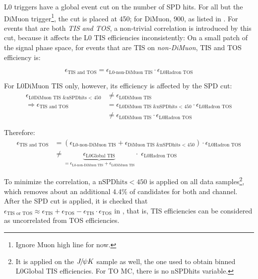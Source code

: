 L0 triggers have a global event cut on the number of SPD hits.
For all but the DiMuon trigger\footnote{
    Ignore Muon high \pt line for now.
}, the cut is placed at 450; for DiMuon, 900,
as listed in \cite{LHCb-INT-2019-025}.
For events that are both \emph{TIS and TOS}, a non-trivial correlation is
introduced by this cut, because it affects the L0 TIS efficiencies
inconsistently:
On a small patch of the signal \B phase space,
for events that are TIS on \emph{non-DiMuon}, TIS and TOS efficiency is:

\begin{equation}
    \epsilon_\text{TIS and TOS} =
        \epsilon_\text{L0-non-DiMuon TIS} \cdot \epsilon_\text{L0Hadron TOS}
\end{equation}

For L0DiMuon TIS only, however, its efficiency is affected by the SPD cut:
\begin{align}
    \epsilon_\text{L0DiMuon TIS \& nSPDhits < 450} & \neq
        \epsilon_\text{L0DiMuon TIS} \\
    \Rightarrow \epsilon_\text{TIS and TOS} & =
            \epsilon_\text{L0DiMuon TIS \& nSPDhits < 450} \cdot
            \epsilon_\text{L0Hadron TOS} \\
        & \neq
        \epsilon_\text{L0DiMuon TIS} \cdot \epsilon_\text{L0Hadron TOS}
\end{align}

Therefore:
\begin{align}
    \epsilon_\text{TIS and TOS} & =
        (\epsilon_\text{L0-non-DiMuon TIS} +
         \epsilon_\text{DiMuon TIS \& nSPDhits < 450}) \cdot
         \epsilon_\text{L0Hadron TOS} \\
    & \neq
        \underbrace{\epsilon_\text{L0Global TIS}}_{
            = \epsilon_\text{L0-non-DiMuon TIS} +
              \epsilon_\text{L0DiMuon TIS}
         } \cdot\; \epsilon_\text{L0Hadron TOS}
\end{align}

To minimize the correlation, a $\text{nSPDhits} < 450$ is applied on all data
samples\footnote{
    It is applied on the ${{J\mskip -3mu/\mskip -2mu\psi}} K$ sample as well, the one used to obtain
    binned L0Global TIS efficiencies.
    For TO MC, there is no nSPDhits variable.
}, which removes about an additional 4.4\% of candidates for both \Dz and
\Dstar channel.
After the SPD cut is applied, it is checked that
$\epsilon_\text{TIS or TOS} \approx \epsilon_\text{TIS} + \epsilon_\text{TOS} -
\epsilon_\text{TIS} \cdot \epsilon_\text{TOS}$
in \cite{LHCb-INT-2019-025},
that is, TIS efficiencies can be considered as uncorrelated from
TOS efficiencies.



